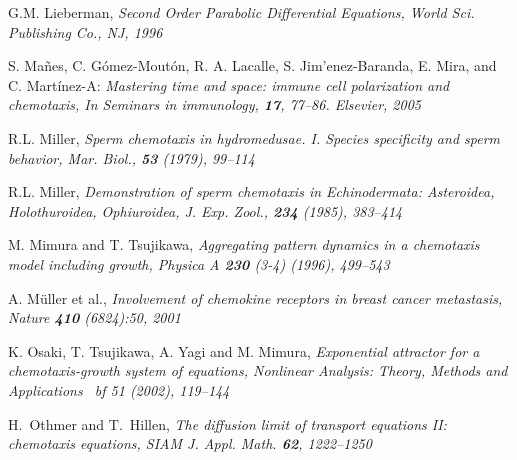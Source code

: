 \documentclass[12pt,reqno]{amsart}
\begin{document}
\begin{thebibliography}{[MT]}
 G.M. Lieberman, \it Second Order Parabolic Differential Equations, \rm World Sci. Publishing Co., NJ, 1996


 S. Ma\~nes, C. G\'omez-Mout\'on, R. A. Lacalle, S. Jim'enez-Baranda, E. Mira,
and C. Mart\'inez-A: \it Mastering time and space: immune cell polarization and chemotaxis, \rm In Seminars in immunology, {\bf 17}, 77--86. Elsevier, 2005


 R.L. Miller, \it Sperm chemotaxis in hydromedusae. I. Species specificity and sperm behavior, \rm Mar. Biol., {\bf 53} (1979), 99--114

 R.L. Miller, \it Demonstration of sperm chemotaxis in Echinodermata: Asteroidea, Holothuroidea, Ophiuroidea, \rm J. Exp. Zool., {\bf 234} (1985), 383--414

 M. Mimura and T. Tsujikawa, \it Aggregating pattern dynamics in a chemotaxis model including growth, \rm
Physica A {\bf 230} (3-4) (1996), 499--543


 A. M\"uller
et al.,
\it Involvement of chemokine
receptors in breast cancer metastasis, \rm Nature {\bf 410} (6824):50, 2001


 K. Osaki, T. Tsujikawa, A. Yagi and M. Mimura, \it Exponential attractor for a chemotaxis-growth system of
equations, \rm Nonlinear Analysis: Theory, Methods and Applications {\ bf 51} (2002), 119--144

 H.~Othmer and T.~Hillen, \it The diffusion limit of transport equations II: chemotaxis equations, \rm SIAM J. Appl. Math. {\bf 62}, 1222--1250



\end{thebibliography}
\end{document}
